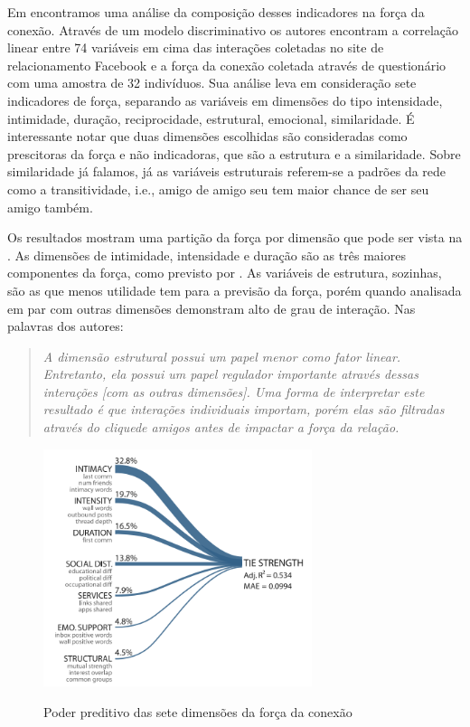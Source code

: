 Em \citet{Gilbert2009} encontramos uma análise da composição desses indicadores
na força da conexão. Através de um modelo discriminativo os autores encontram a
correlação linear entre 74 variáveis em cima das interações coletadas no site de
relacionamento Facebook e a força da conexão coletada através de questionário
com uma amostra de 32 indivíduos. Sua análise leva em consideração sete indicadores
de força, separando as variáveis em dimensões do tipo intensidade, intimidade,
duração, reciprocidade, estrutural, emocional, similaridade. É interessante
notar que duas dimensões escolhidas são consideradas como prescitoras da força e
não indicadoras, que são a estrutura e a similaridade. Sobre similaridade já
falamos, já as variáveis estruturais referem-se a padrões da rede como a
transitividade, i.e., amigo de amigo seu tem maior chance de ser seu amigo
também.

Os resultados mostram uma partição da força por dimensão que pode ser vista na
. As dimensões de intimidade, intensidade e duração são as três
maiores componentes da força, como previsto por \citeauthor{Granovetter1973}. As
variáveis de estrutura, sozinhas, são as que menos utilidade tem para a previsão
da força, porém quando analisada em par com outras dimensões demonstram alto de
grau de interação. Nas palavras dos autores:

	\begin{quote}{\citep{Gilbert2009}}
	\emph{A dimensão estrutural possui um papel menor como fator linear.
	Entretanto, ela possui um papel regulador importante através dessas interações
	[com as outras dimensões]. Uma forma de interpretar este resultado é que
	interações individuais importam, porém elas são filtradas através do
	clique\footnotemark de amigos antes de impactar a força da
	relação.}
	\end{quote}


\begin{figure}[h!]
  \caption{Poder preditivo das sete dimensões da força da conexão \citep{Gilbert2009}}
  \centering
    \includegraphics[width=0.7\textwidth]{imgs/composicao-forca.png}
    \label{fig:forca}
\end{figure}


